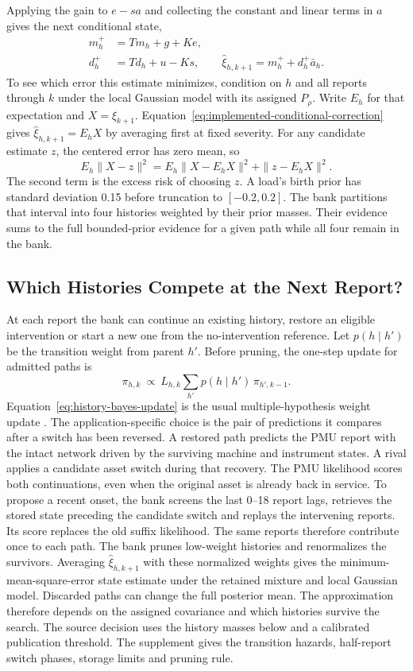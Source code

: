 Applying the gain to $e-sa$ and collecting the constant and linear
terms in $a$ gives the next conditional state,
\begin{align}
 m_h^+ &= Tm_h+g+Ke,\nonumber\\
 d_h^+ &= Td_h+u-Ks,\qquad
 \widehat{\xi}_{h,k+1}=m_h^++d_h^+\bar a_h .
 \label{eq:implemented-conditional-correction}
\end{align}
To see which error this estimate minimizes, condition on $h$ and all
reports through $k$ under the local Gaussian model with its assigned
$P_\rho$. Write $E_h$ for that expectation and $X=\xi_{k+1}$.
Equation~\eqref{eq:implemented-conditional-correction} gives
$\widehat{\xi}_{h,k+1}=E_h X$ by averaging first at fixed severity.
For any candidate estimate $z$, the centered error has zero mean, so
\[
 E_h\|X-z\|^2=E_h\|X-E_hX\|^2+\|z-E_hX\|^2 .
\]
The second term is the excess risk of choosing $z$. A load's birth prior has standard
deviation 0.15 before truncation to $[-0.2,0.2]$. The bank partitions
that interval into four histories weighted by their prior masses. Their
evidence sums to the full bounded-prior evidence for a given path while
all four remain in the bank.

\subsection{Which Histories Compete at the Next Report?}

At each report the bank can continue an existing history, restore an
eligible intervention or start a new one from the no-intervention
reference. Let $p(h\mid h')$ be the transition weight from parent $h'$.
Before pruning, the one-step update for admitted paths is
\begin{equation}
 \pi_{h,k}\ \propto\ L_{h,k}
      \sum_{h'}p(h\mid h')\,\pi_{h',k-1}.
 \label{eq:history-bayes-update}
\end{equation}
Equation~\eqref{eq:history-bayes-update} is the usual multiple-hypothesis
weight update \cite{boers2005m3h}. The application-specific choice is the
pair of predictions it compares after a switch has been reversed. A
restored path predicts the PMU report with the intact network driven by
the surviving machine and instrument states. A rival applies a candidate
asset switch during that recovery. The PMU likelihood scores both
continuations, even when the original asset is already back in service.
To propose a recent onset, the bank
screens the last 0--18 report lags, retrieves the stored state preceding
the candidate switch and replays the intervening reports. Its score
replaces the old suffix likelihood. The same reports therefore contribute
once to each path. The bank prunes low-weight histories and renormalizes
the survivors. Averaging $\widehat{\xi}_{h,k+1}$ with these normalized
weights gives the minimum-mean-square-error state estimate under the
retained mixture and local Gaussian model. Discarded paths can change
the full posterior mean. The approximation therefore depends on the
assigned covariance and which histories survive the search.
The source decision uses the history masses below and a calibrated
publication threshold.
The supplement gives the transition hazards, half-report
switch phases, storage limits and pruning rule.

